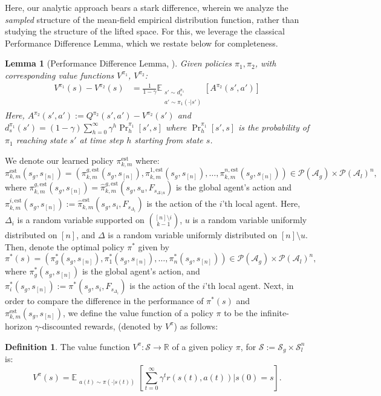 \documentclass{article}
\theoremstyle{plain}
\newtheorem{lemma}[theorem]{Lemma}
\theoremstyle{definition}
\newtheorem{definition}[theorem]{Definition}
\def\est{\mathrm{est}}
\def\E{\mathbb{E}}
\begin{document}
Here, our analytic approach bears a stark difference, wherein we analyze the \emph{sampled} structure of the mean-field empirical distribution function, rather than studying the structure of the lifted space. For this, we leverage the classical Performance Difference Lemma, which we restate below for completeness.

\begin{lemma}[Performance Difference Lemma, \cite{Kakade+Langford:2002}]\label{theorem: performance difference lemma} Given policies $\pi_1, \pi_2$, with corresponding value functions $V^{\pi_1}$, $V^{\pi_2}$:
\begin{align*}
    V^{\pi_1}(s) - V^{\pi_2}(s) &= \frac{1}{1-\gamma} \E_{\substack{s'\sim d^{\pi_1}_s \\ a'\sim \pi_1(\cdot|s')} } [A^{\pi_2}(s',a')]
\end{align*}
\emph{Here, $A^{\pi_2}(s',a'):= Q^{\pi_2}(s',a') - V^{\pi_2}(s')$ and $d_s^{\pi_1}(s') = (1-\gamma) \sum_{h=0}^\infty \gamma^h \Pr_h^{\pi_1}[s',s]$ where $\Pr_h^{\pi_1}[s',s]$ is the probability of $\pi_1$ reaching state $s'$ at time step $h$ starting from state $s$.}
\end{lemma}
We denote our learned policy ${\pi}_{k,m}^\est$ where:
\[{\pi}_{k,m}^\est(s_g,s_{[n]}) = ({\pi}_{k,m}^{g,\est}(s_g,s_{[n]}), {\pi}_{k,m}^{1,\est}(s_g,s_{[n]}), \dots,{\pi}_{k,m}^{n,\est}(s_g,s_{[n]})) \in \mathcal{P}(\mathcal{A}_g)\times\mathcal{P}(\mathcal{A}_l)^n,\]
where ${\pi}_{k,m}^{g,\est}(s_g,s_{[n]}) = \hat{\pi}_{k,m}^{g,\est}(s_g,s_u, F_{s_{\Delta\setminus u}})$ is the global agent's action and ${\pi}_{k,m}^{i,\est}(s_g,s_{[n]}) := \hat{\pi}_{k,m}^{\est}(s_g,s_i, F_{s_{\Delta_i}})$ is the action of the $i$'th local agent. Here, $\Delta_i$ is a random variable supported on ${[n]\setminus i \choose k-1}$, $u$ is a random variable uniformly distributed on $[n]$, and $\Delta$ is a random variable uniformly distributed on $[n]\setminus u$. Then, denote the optimal policy $\pi^*$ given by 
\[\pi^*(s) = (\pi^*_g(s_g,s_{[n]}), \pi_1^*(s_g,s_{[n]}),\dots,\pi_n^*(s_g,s_{[n]}))\in \mathcal{P}(\mathcal{A}_g)\times\mathcal{P}(\mathcal{A}_l)^n,\]
where $\pi^*_g(s_g,s_{[n]})$ is the global agent's action, and $\pi_i^*(s_g,s_{[n]}):=\pi^*(s_g,s_i,F_{s_{\Delta_i}})$ is the action of the $i$'th local agent. Next, in order to compare the difference in the performance of $\pi^*(s)$ and ${\pi}_{k,m}^\est(s_g,s_{[n]})$, we define the value function of a policy $\pi$ to be the infinite-horizon $\gamma$-discounted rewards, (denoted by $V^\pi$) as follows:
\begin{definition}
    The value function $V^\pi: \mathcal{S} \to \mathbb{R}$ of a given policy $\pi$, for $\mathcal{S}:=\mathcal{S}_g\times\mathcal{S}_l^n$ is:
\begin{equation}
V^\pi(s)=\mathbb{E}_{\substack{a(t)\sim \pi(\cdot|s(t))}} \left[\sum_{t=0}^\infty  \gamma^t r(s(t),a(t))|s(0)=s\right].\end{equation}
\end{definition}
\end{document}
